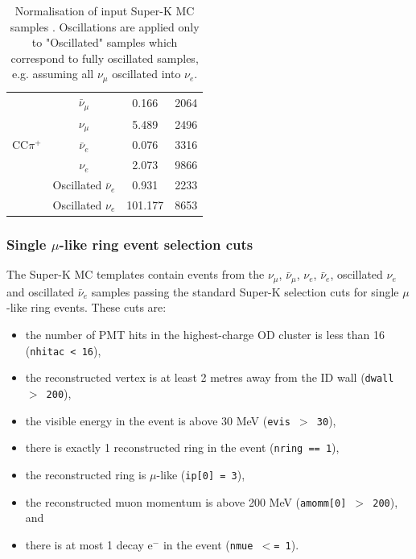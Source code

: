 \begin{table}
\begin{tabular}{| c | c | c | c |}
\hline
		&$\bar{\nu}_{\mu}$             &     0.166          &       2064               \\
		&$\nu_{\mu}$                   &     5.489          &       2496               \\
CC$\pi^+$	&$\bar{\nu}_{e}$               &      0.076           &       3316               \\
		&$\nu_{e}$                     &      2.073           &       9866               \\
		&Oscillated $\bar{\nu}_{e}$    &     0.931          &       2233               \\
		&Oscillated $\nu_{e}$          &     101.177          &       8653               \\
\hline	
\end{tabular}
\caption{
  Normalisation of input Super-K MC samples \cite{SuperkMC14a}. Oscillations are applied only to "Oscillated" samples
  which correspond to fully oscillated samples, e.g. assuming all $\nu_{\mu}$ oscillated into $\nu_e$.
}
\label{tab:SKMCNormalisation}
\end{table}




\subsubsection {Single $\mu$-like ring event selection cuts}
\label{sec:mc_templates:1Rmu_cuts}

The Super-K MC templates contain events from the 
$\nu_{\mu}$, $\bar{\nu}_{\mu}$, $\nu_{e}$, $\bar{\nu}_{e}$, oscillated $\nu_{e}$ and oscillated $\bar{\nu}_{e}$ 
 samples passing the standard Super-K selection cuts for single $\mu$-like ring events.
These cuts are:

\begin{itemize}
\item
the number of PMT hits in the highest-charge OD cluster is less than 16
({\tt nhitac < 16}),
\item
the reconstructed vertex is at least 2 metres away from the ID wall 
({\tt dwall $>$ 200}),
\item
the visible energy in the event is above 30 MeV 
({\tt evis  $>$ 30}),
\item
there is exactly 1 reconstructed ring in the event 
({\tt nring == 1}),
\item
the reconstructed ring is $\mu$-like 
({\tt ip[0] = 3}),
\item
the reconstructed muon momentum is above 200 MeV 
({\tt amomm[0] $>$ 200}), and
\item
there is at most 1 decay e$^{-}$ in the event 
({\tt nmue $<$= 1}).
\end{itemize}

